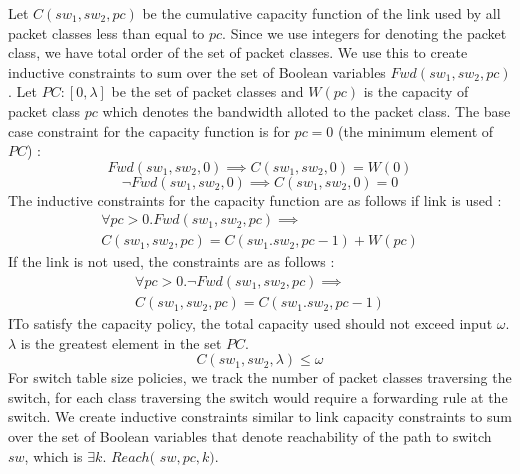 Let $C(sw_1,sw_2,pc)$ be the cumulative capacity function of the link used by all packet classes less than equal to $pc$. Since we use integers for denoting the packet class, we have total order of the set of packet classes. We use this to create inductive constraints to sum over the set of Boolean variables $Fwd(sw_1, sw_2,pc)$. Let $PC : [0, \lambda]$ be the set of packet classes and $W(pc)$ is the capacity of packet class $pc$ which denotes the bandwidth alloted to the packet class. 
The base case constraint for the capacity function is for $pc = 0$ (the minimum element of $PC$) :
\begin{equation}
	Fwd(sw_1, sw_2, 0) \implies C(sw_1, sw_2, 0) = W(0)
\end{equation}
\begin{equation}
	\neg Fwd(sw_1, sw_2, 0) \implies C(sw_1, sw_2, 0) = 0
\end{equation} 
The inductive constraints for the capacity function are as follows if link is used : 
\begin{multline}
	\forall pc > 0. Fwd(sw_1,sw_2,pc) \implies \\ C(sw_1, sw_2, pc) =  C(sw_1. sw_2, pc - 1) + W(pc)
\end{multline}
If the link is not used, the constraints are as follows : 
\begin{multline}
\forall pc > 0. \neg Fwd(sw_1,sw_2,pc) \implies \\ C(sw_1, sw_2, pc) =  C(sw_1. sw_2, pc - 1)
\end{multline}
ITo satisfy the capacity policy, the total capacity used should not exceed input $\omega$. $\lambda$ is the greatest element in the set $PC$. 
\begin{equation}
	C(sw_1, sw_2, \lambda) \leq \omega	
\end{equation} 
For switch table size policies, we track the number of packet classes traversing the switch, for each class traversing the switch would require a forwarding rule at the switch. We create inductive constraints similar to link capacity constraints to sum over the set of Boolean variables that denote reachability of the path to switch $sw$, which is $\exists k$. $Reach($ $sw,pc,k)$.